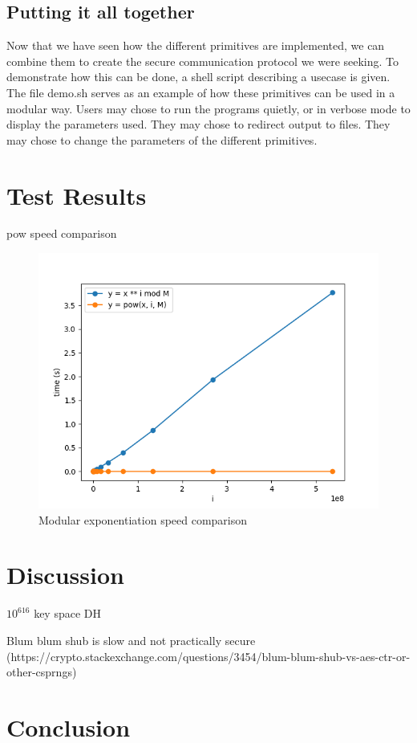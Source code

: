 \documentclass{article}
\begin{document}
\subsection{Putting it all together}

Now that we have seen how the different primitives are implemented, we can combine them to create the secure communication protocol we were seeking. To demonstrate how this can be done, a shell script describing a usecase is given. The file demo.sh serves as an example of how these primitives can be used in a modular way. Users may chose to run the programs quietly, or in verbose mode to display the parameters used. They may chose to redirect output to files. They may chose to change the parameters of the different primitives. 

\section{Test Results}

pow speed comparison

\begin{figure}
    \includegraphics[]{pow_speed.png}
    \caption{Modular exponentiation speed comparison}
    \label{fig:pow_speed}
\end{figure}


\section{Discussion}

$10^{616}$ key space DH

Blum blum shub is slow and not practically secure (https://crypto.stackexchange.com/questions/3454/blum-blum-shub-vs-aes-ctr-or-other-csprngs)

\section{Conclusion}





\end{document}
